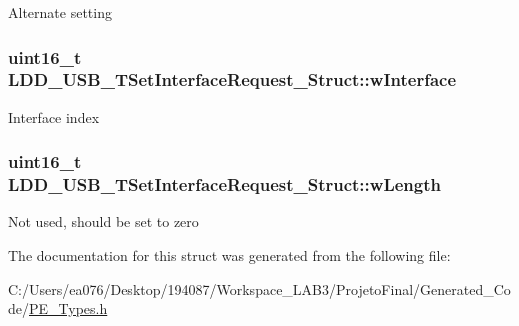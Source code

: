 Alternate setting \hypertarget{struct_l_d_d___u_s_b___t_set_interface_request___struct_a6554d6522c7dcbd0e96cbe945b1725de}{
\subsubsection[{w\-Interface}]{\setlength{\rightskip}{0pt plus 5cm}uint16\-\_\-t L\-D\-D\-\_\-\-U\-S\-B\-\_\-\-T\-Set\-Interface\-Request\-\_\-\-Struct\-::w\-Interface}}\label{struct_l_d_d___u_s_b___t_set_interface_request___struct_a6554d6522c7dcbd0e96cbe945b1725de}
Interface index \hypertarget{struct_l_d_d___u_s_b___t_set_interface_request___struct_a7ccdd1f214e5cebbc10cde359ccba50e}{
\subsubsection[{w\-Length}]{\setlength{\rightskip}{0pt plus 5cm}uint16\-\_\-t L\-D\-D\-\_\-\-U\-S\-B\-\_\-\-T\-Set\-Interface\-Request\-\_\-\-Struct\-::w\-Length}}\label{struct_l_d_d___u_s_b___t_set_interface_request___struct_a7ccdd1f214e5cebbc10cde359ccba50e}
Not used, should be set to zero 

The documentation for this struct was generated from the following file\-:\begin{DoxyCompactItemize}
\item 
C\-:/\-Users/ea076/\-Desktop/194087/\-Workspace\-\_\-\-L\-A\-B3/\-Projeto\-Final/\-Generated\-\_\-\-Code/\hyperlink{_p_e___types_8h}{P\-E\-\_\-\-Types.\-h}\end{DoxyCompactItemize}
